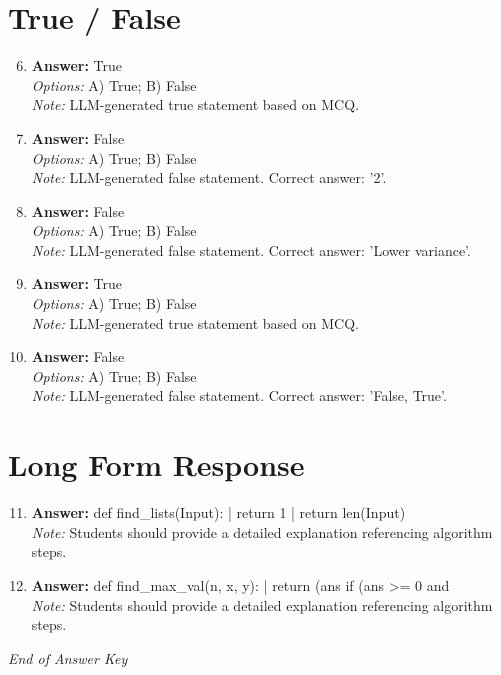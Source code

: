\documentclass[12pt]{article}
\begin{document}
\section*{True / False}
\begin{enumerate}[label=\arabic*.]
\setcounter{enumi}{5}
\item \textbf{Answer:} True
\\ \textit{Options:} A) True; B) False
\\ \textit{Note:} LLM-generated true statement based on MCQ.
\item \textbf{Answer:} False
\\ \textit{Options:} A) True; B) False
\\ \textit{Note:} LLM-generated false statement. Correct answer: '2'.
\item \textbf{Answer:} False
\\ \textit{Options:} A) True; B) False
\\ \textit{Note:} LLM-generated false statement. Correct answer: 'Lower variance'.
\item \textbf{Answer:} True
\\ \textit{Options:} A) True; B) False
\\ \textit{Note:} LLM-generated true statement based on MCQ.
\item \textbf{Answer:} False
\\ \textit{Options:} A) True; B) False
\\ \textit{Note:} LLM-generated false statement. Correct answer: 'False, True'.
\end{enumerate}

\section*{Long Form Response}
\begin{enumerate}[label=\arabic*.]
\setcounter{enumi}{10}
\item \textbf{Answer:} def find\_lists(Input): | return 1 | return len(Input)
\\ \textit{Note:} Students should provide a detailed explanation referencing algorithm steps.
\item \textbf{Answer:} def find\_max\_val(n, x, y): | return (ans if (ans \textgreater{}= 0 and
\\ \textit{Note:} Students should provide a detailed explanation referencing algorithm steps.
\end{enumerate}

\vfill
\noindent\textit{End of Answer Key}
\end{document}
